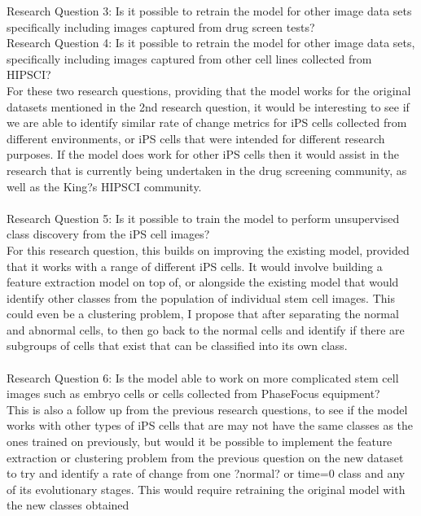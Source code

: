 {Research Question 3: Is it possible to retrain the model for other image data sets specifically including images captured from drug screen tests? \\ 
 Research Question 4: Is it possible to retrain the model for other image data sets, specifically including images captured from other cell lines collected from HIPSCI? \\ 
 For these two research questions, providing that the model works for the original datasets mentioned in the 2nd research question, it would be interesting to see if we are able to identify similar rate of change metrics for iPS cells collected from different environments, or iPS cells that were intended for different research purposes. If the model does work for other iPS cells then it would assist in the research that is currently being undertaken in the drug screening community, as well as the King?s HIPSCI community. \\ \\ 
Research Question 5: Is it possible to train the model to perform unsupervised class discovery from the iPS cell images? \\ 
For this research question, this builds on improving the existing model, provided that it works with a range of different iPS cells. It would involve building a feature extraction model on top of, or alongside the existing model that would identify other classes from the population of individual stem cell images. This could even be a clustering problem, I propose that after separating the normal and abnormal cells, to then go back to the normal cells and identify if there are subgroups of cells that exist that can be classified into its own class. \\ \\ 
Research Question 6: Is the model able to work on more complicated stem cell images such as embryo cells or cells collected from PhaseFocus equipment? \\ 
This is also a follow up from the previous research questions, to see if the model works with other types of iPS cells that are may not have the same classes as the ones trained on previously, but would it be possible to implement the feature extraction or clustering problem from the previous question on the new dataset to try and identify a rate of change from one ?normal? or time=0 class and any of its evolutionary stages. This would require retraining the original model with the new classes obtained
}
